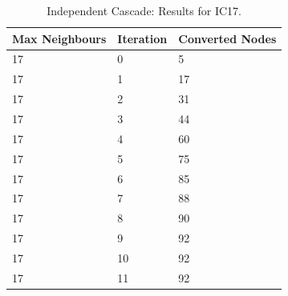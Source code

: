 \begin{table}
\centering
\begin{tabular}{|l||l|l|}
\hline
Max Neighbours & Iteration & Converted Nodes \\
\hline
17 & 0 & 5 \\
17 & 1 & 17 \\
17 & 2 & 31 \\
17 & 3 & 44 \\
17 & 4 & 60 \\
17 & 5 & 75 \\
17 & 6 & 85 \\
17 & 7 & 88 \\
17 & 8 & 90 \\
17 & 9 & 92 \\
17 & 10 & 92 \\
17 & 11 & 92 \\
\hline
\end{tabular}
\caption{Independent Cascade: Results for IC17.}
\label{tab:ic_results17}
\end{table}

